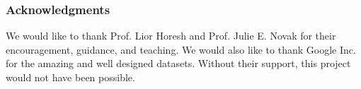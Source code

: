 \documentclass{article}
\begin{document}







\subsubsection*{Acknowledgments}
We would like to thank Prof. Lior Horesh and Prof. Julie E. Novak for their encouragement, guidance, and teaching. We would also like to thank Google Inc. for the amazing and well designed datasets. Without their support, this project would not have been possible.




\end{document}
